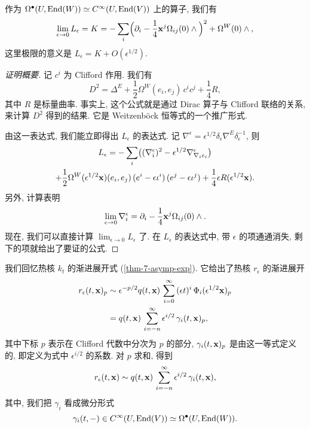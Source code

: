 \begin{proposition} \label{thm-10-lim-l-epsilon}
    作为 $\Omega^\bullet (U, \operatorname{End} (W)) \simeq C^\infty (U, \operatorname{End} (V))$
    上的算子, 我们有
    \[ \lim_{\epsilon \to 0} L_\epsilon = K
        = -\sum_i \Bigl( \partial_i - \frac14 \bfx^j \Omega_{ij} (0) \wedge {} \Bigr)^2
            + \Omega^W (0) \wedge {}, \]
    这里极限的意义是 $L_\epsilon = K + O(\epsilon^{1/2})$.
\end{proposition}

\begin{proof} [证明概要]
    记 $c^i$ 为 Clifford 作用. 我们有  \cite[\S3.5]{bgv}
    \[ D^2 = \Delta^E + \frac12 \Omega^W (e_i, e_j) \, c^i c^j + \frac14 R, \]
    其中 $R$ 是标量曲率. 事实上,
    这个公式就是通过 Dirac 算子与 Clifford 联络的关系, 来计算 $D^2$ 得到的结果.
    它是 Weitzenböck 恒等式的一个推广形式.
    
    由这一表达式, 我们能立即得出 $L_\epsilon$ 的表达式.
    记 $\nabla^{\epsilon} = 
    \epsilon^{1/2} \delta_\epsilon \nabla^E \delta_\epsilon^{-1}$, 则
    \begin{multline*}
        L_\epsilon = -\sum_i \bigl( (\nabla_i^{\epsilon})^2 
        - \epsilon^{1/2} \nabla_{\nabla_i e_i}^{\epsilon} \bigr) \\
        + \frac12 \Omega^W (\epsilon^{1/2} \bfx) (e_i, e_j) \, 
        (e^i - \epsilon \iota^i) \, (e^j - \epsilon \iota^j)
        + \frac14 \epsilon R (\epsilon^{1/2} \bfx).
    \end{multline*}
    另外, 计算表明
    \[ \lim_{\epsilon \to 0} \nabla_i^{\epsilon} = \partial_i -
        \frac14 \bfx^j \Omega_{ij} (0) \wedge {}. \]
    现在, 我们可以直接计算 $\lim_{\epsilon \to 0} L_\epsilon$ 了.
    在 $L_\epsilon$ 的表达式中, 带 $\epsilon$ 的项通通消失,
    剩下的项就给出了要证的公式.
\end{proof}

我们回忆热核 $k_t$ 的渐进展开式 (\ref{thm-7-asymp-exp}).
它给出了热核 $r_\epsilon$ 的渐进展开
\begin{align*}
    r_\epsilon (t, \bfx)_p
    & \sim \epsilon^{-p/2} q (t, \bfx) \, \sum_{i=0}^\infty {} 
        (\epsilon t)^i \, \Phi_i (\epsilon^{1/2} \bfx)_p \\
    & = q (t, \bfx) \, \sum_{i=-n}^\infty {}
        \epsilon^{i/2} \, \gamma_i (t, \bfx)_p,
\end{align*}
其中下标 $p$ 表示在 Clifford 代数中分次为 $p$ 的部分,
$\gamma_i (t, \mathbf{x})_p$ 是由这一等式定义的, 即定义为式中 $\epsilon^{i/2}$ 的系数.
对 $p$ 求和, 得到
\begin{equation} \label{eq-10-r-and-gamma}
    r_\epsilon (t, \bfx) \sim q (t, \bfx) \, \sum_{i=-n}^\infty {}
        \epsilon^{i/2} \, \gamma_i (t, \bfx),
\end{equation}
其中, 我们把 $\gamma_i$ 看成微分形式
\[ \gamma_i (t, -) \in C^\infty (U, \operatorname{End} (V)) 
    \simeq \Omega^\bullet (U, \operatorname{End} (W)). \]


